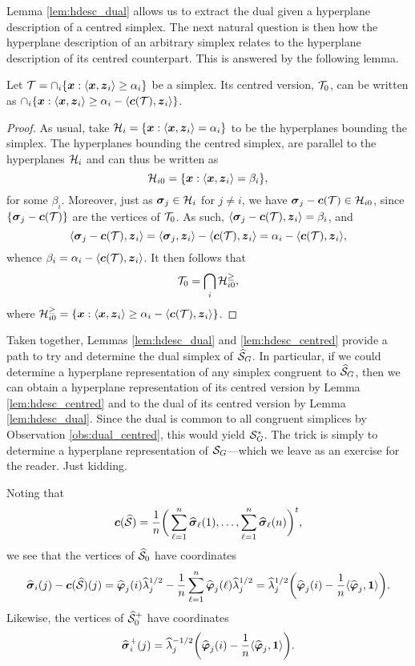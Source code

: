Lemma \ref{lem:hdesc_dual} allows us to extract the dual given a hyperplane description of a centred simplex. The next natural question is then how the hyperplane description of an arbitrary simplex relates to the hyperplane description of its centred counterpart. This is answered by the following lemma. 

\begin{lemma}
	\label{lem:hdesc_centred}
	Let $\mathcal{T}=\cap_i \{\vb*{x}:\langle \vb*{x},\vb*{z}_i\rangle \geq \alpha_i\}$ be a simplex. Its centred version, $\mathcal{T}_0$, can be written as $\cap_i \{\vb*{x}:\langle \vb*{x},\vb*{z}_i\rangle \geq \alpha_i - \langle \vb*{c}(\mathcal{T}),\vb*{z}_i\rangle\}$. 
\end{lemma}
\begin{proof}
	As usual, take $\mathcal{H}_i = \{\vb*{x}:\langle \vb*{x},\vb*{z}_i\rangle = \alpha_i\}$ to be the hyperplanes bounding the simplex. The hyperplanes bounding the centred simplex, are parallel to the hyperplanes $\mathcal{H}_i$ and can thus be written as 
	\[\mathcal{H}_{i0} = \{\vb*{x}:\langle \vb*{x},\vb*{z}_i\rangle = \beta_i\},\]
	for some $\beta_i$. Moreover, just as $\vb*{\sigma}_j\in\mathcal{H}_i$ for $j\neq i$, we have $\vb*{\sigma}_j-\vb*{c}(\mathcal{T})\in \mathcal{H}_{i0}$, since $\{\vb*{\sigma}_j-\vb*{c}(\mathcal{T})\}$ are the vertices of $\mathcal{T}_0$. As such, $\langle \vb*{\sigma}_j-\vb*{c}(\mathcal{T}),\vb*{z}_i\rangle=\beta_i$, and 
	\[\langle \vb*{\sigma}_j-\vb*{c}(\mathcal{T}),\vb*{z}_i\rangle = \langle \vb*{\sigma}_j,\vb*{z}_i\rangle - \langle\vb*{c}(\mathcal{T}),\vb*{z}_i\rangle = \alpha_i - \langle\vb*{c}(\mathcal{T}),\vb*{z}_i\rangle,\]
	whence $\beta_i = \alpha_i - \langle\vb*{c}(\mathcal{T}),\vb*{z}_i\rangle$. It then follows that 
	\[\mathcal{T}_0=\bigcap_i \mathcal{H}_{i0}^{\geq },\]
	where $\mathcal{H}_{i0}^\geq = \{\vb*{x}:\langle \vb*{x},\vb*{z}_i\rangle \geq  \alpha_i - \langle \vb*{c}(\mathcal{T}),
	\vb*{z}_i\rangle\}$. 
\end{proof}

Taken together, Lemmas \ref{lem:hdesc_dual} and \ref{lem:hdesc_centred} provide a path to try and determine the dual simplex of $\widehat{\mathcal{S}}_G$. In particular, if we could determine a hyperplane representation of any simplex congruent to $\widehat{\mathcal{S}}_G$,  then we can obtain a hyperplane representation of its centred version by Lemma \ref{lem:hdesc_centred} and to the dual of its centred version by Lemma \ref{lem:hdesc_dual}. Since the dual is common to all congruent simplices by Observation \ref{obs:dual_centred}, this would yield $\mathcal{S}_G^*$. The trick is simply to determine a hyperplane representation of $\mathcal{S}_G$---which we leave as an exercise for the reader. Just kidding. 

 

Noting that 
\begin{equation*}
\vb*{c}(\widehat{\mathcal{S}}) = \frac{1}{n}\bigg(\sum_{\ell=1}^n \widehat{\vb*{\sigma}}_\ell(1),\dots,\sum_{\ell=1}^n \widehat{\vb*{\sigma}}_\ell(n)\bigg)^t,
\end{equation*}
we see that the vertices of $\widehat{\mathcal{S}}_0$ have coordinates
\begin{equation*}
\widehat{\vb*{\sigma}}_i(j) - \vb*{c}(\widehat{\mathcal{S}})(j) = \widehat{\vb*{\varphi}}_j(i)\widehat{\lambda}_j^{1/2} - \frac{1}{n}\sum_{\ell=1}^n \widehat{\vb*{\varphi}}_j(\ell)\widehat{\lambda}_j^{1/2} = \widehat{\lambda}_j^{1/2} \bigg(\widehat{\vb*{\varphi}}_j(i) - \frac{1}{n}\langle \widehat{\vb*{\varphi}}_j,\vb{1}\rangle \bigg).
\end{equation*}
Likewise, the vertices of $\widehat{\mathcal{S}}_0^+$ have coordinates 
\begin{equation*}
\widehat{\vb*{\sigma}}_i^+(j) = \widehat{\lambda}_j^{-1/2}\bigg(\widehat{\vb*{\varphi}}_j(i) - \frac{1}{n}\langle \widehat{\vb*{\varphi}}_j,\vb{1}\rangle\bigg).
\end{equation*}

